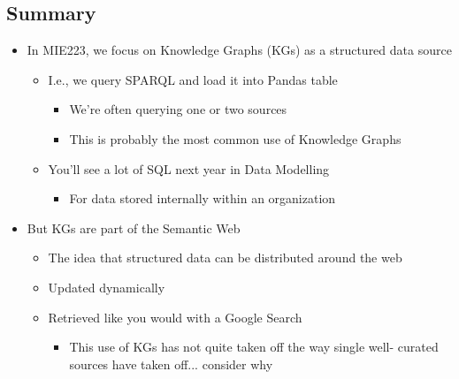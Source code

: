 \documentclass[11pt]{article}
\theoremstyle{definition}
\begin{document}
\subsection{Summary}
\begin{itemize}
    \item In MIE223, we focus on Knowledge Graphs (KGs) as a
    structured data source
    \begin{itemize}
        \item I.e., we query SPARQL and load it into Pandas table
        \begin{itemize}
            \item We’re often querying one or two sources
            \item This is probably the most common use of Knowledge Graphs
        \end{itemize}
        \item You’ll see a lot of SQL next year in Data Modelling
        \begin{itemize}
            \item For data stored internally within an organization
        \end{itemize}
    \end{itemize}
    \item But KGs are part of the Semantic Web
    \begin{itemize}
        \item The idea that structured data can be distributed around the web
        \item Updated dynamically
        \item Retrieved like you would with a Google Search
        \begin{itemize}
            \item This use of KGs has not quite taken off the way single well-
            curated sources have taken off... consider why
        \end{itemize}
    \end{itemize}
\end{itemize}
\end{document}
